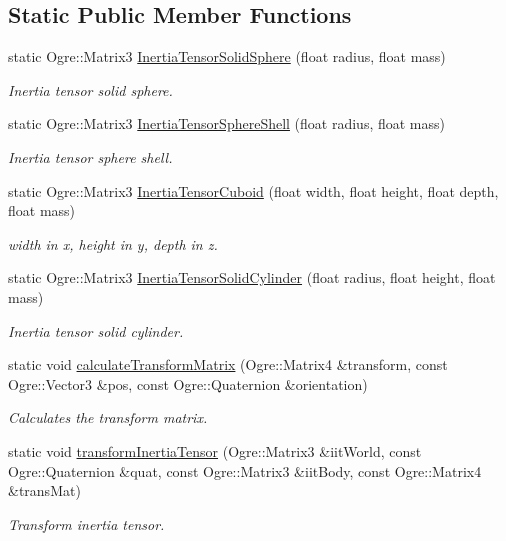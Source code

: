 \subsection*{Static Public Member Functions}
\begin{DoxyCompactItemize}
\item 
static Ogre\-::\-Matrix3 \hyperlink{class_objects_1_1_rigid_body_object_aa2d2a29fce3f2f6e893bf16cd965cc45}{Inertia\-Tensor\-Solid\-Sphere} (float radius, float mass)
\begin{DoxyCompactList}\small\item\em Inertia tensor solid sphere. \end{DoxyCompactList}\item 
static Ogre\-::\-Matrix3 \hyperlink{class_objects_1_1_rigid_body_object_a5b7c2c8986ef85a532c149b6a2364c83}{Inertia\-Tensor\-Sphere\-Shell} (float radius, float mass)
\begin{DoxyCompactList}\small\item\em Inertia tensor sphere shell. \end{DoxyCompactList}\item 
static Ogre\-::\-Matrix3 \hyperlink{class_objects_1_1_rigid_body_object_ad18e3a54eb181c68c17699969580bef1}{Inertia\-Tensor\-Cuboid} (float width, float height, float depth, float mass)
\begin{DoxyCompactList}\small\item\em width in x, height in y, depth in z. \end{DoxyCompactList}\item 
static Ogre\-::\-Matrix3 \hyperlink{class_objects_1_1_rigid_body_object_a94345e8ddfed29826c8b53d4aff2ee7a}{Inertia\-Tensor\-Solid\-Cylinder} (float radius, float height, float mass)
\begin{DoxyCompactList}\small\item\em Inertia tensor solid cylinder. \end{DoxyCompactList}\item 
static void \hyperlink{class_objects_1_1_rigid_body_object_af2cc1454d37839b75ad66afd8a70b926}{calculate\-Transform\-Matrix} (Ogre\-::\-Matrix4 \&transform, const Ogre\-::\-Vector3 \&pos, const Ogre\-::\-Quaternion \&orientation)
\begin{DoxyCompactList}\small\item\em Calculates the transform matrix. \end{DoxyCompactList}\item 
static void \hyperlink{class_objects_1_1_rigid_body_object_ac64b21afafd915bb3c8bfc6311920b67}{transform\-Inertia\-Tensor} (Ogre\-::\-Matrix3 \&iit\-World, const Ogre\-::\-Quaternion \&quat, const Ogre\-::\-Matrix3 \&iit\-Body, const Ogre\-::\-Matrix4 \&trans\-Mat)
\begin{DoxyCompactList}\small\item\em Transform inertia tensor. \end{DoxyCompactList}\end{DoxyCompactItemize}
